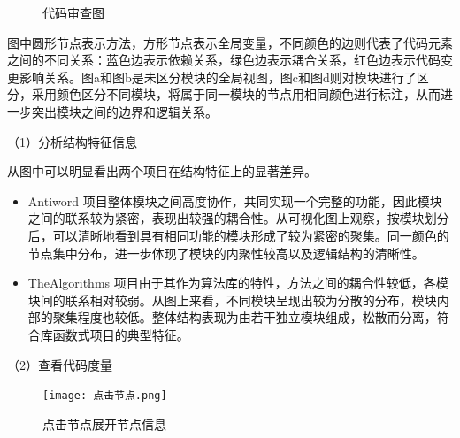 \begin{figure}[!h]
    \setlength{\subfigcapskip}{-1bp}
    \centering
    \begin{minipage}{\textwidth}
    \centering
    \hspace{2em}
    \end{minipage}
    \centering
    \begin{minipage}{\textwidth}
    \centering
    \hspace{2em}
    \end{minipage}
    \vspace{0.2em}
    \caption{代码审查图} %
    \label{1_代码审查图}
\end{figure}


图中圆形节点表示方法，方形节点表示全局变量，不同颜色的边则代表了代码元素之间的不同关系：蓝色边表示依赖关系，绿色边表示耦合关系，红色边表示代码变更影响关系。图a和图b是未区分模块的全局视图，图c和图d则对模块进行了区分，采用颜色区分不同模块，将属于同一模块的节点用相同颜色进行标注，从而进一步突出模块之间的边界和逻辑关系。

\noindent（1）分析结构特征信息

从图中可以明显看出两个项目在结构特征上的显著差异。
\begin{itemize}
    \item Antiword 项目整体模块之间高度协作，共同实现一个完整的功能，因此模块之间的联系较为紧密，表现出较强的耦合性。从可视化图上观察，按模块划分后，可以清晰地看到具有相同功能的模块形成了较为紧密的聚集。同一颜色的节点集中分布，进一步体现了模块的内聚性较高以及逻辑结构的清晰性。
    
    \item TheAlgorithms 项目由于其作为算法库的特性，方法之间的耦合性较低，各模块间的联系相对较弱。从图上来看，不同模块呈现出较为分散的分布，模块内部的聚集程度也较低。整体结构表现为由若干独立模块组成，松散而分离，符合库函数式项目的典型特征。
\end{itemize}

\noindent（2）查看代码度量

\begin{figure}[h]
\centering
\texttt{[image: 点击节点.png]}
\caption{点击节点展开节点信息}
\end{figure}

